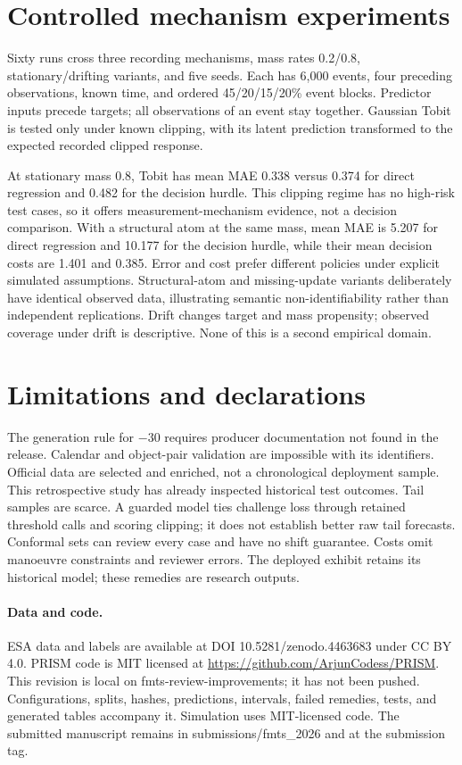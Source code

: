 \documentclass[10pt]{article}
\begin{document}
\section{Controlled mechanism experiments}
Sixty runs cross three recording mechanisms, mass rates 0.2/0.8, stationary/drifting variants, and five seeds. Each has 6,000 events, four preceding observations, known time, and ordered 45/20/15/20\% event blocks. Predictor inputs precede targets; all observations of an event stay together. Gaussian Tobit is tested only under known clipping, with its latent prediction transformed to the expected recorded clipped response.

At stationary mass 0.8, Tobit has mean MAE 0.338 versus 0.374 for direct regression and 0.482 for the decision hurdle. This clipping regime has no high-risk test cases, so it offers measurement-mechanism evidence, not a decision comparison. With a structural atom at the same mass, mean MAE is 5.207 for direct regression and 10.177 for the decision hurdle, while their mean decision costs are 1.401 and 0.385. Error and cost prefer different policies under explicit simulated assumptions. Structural-atom and missing-update variants deliberately have identical observed data, illustrating semantic non-identifiability rather than independent replications. Drift changes target and mass propensity; observed coverage under drift is descriptive. None of this is a second empirical domain.

\section{Limitations and declarations}
The generation rule for $-30$ requires producer documentation not found in the release. Calendar and object-pair validation are impossible with its identifiers. Official data are selected and enriched, not a chronological deployment sample. This retrospective study has already inspected historical test outcomes. Tail samples are scarce. A guarded model ties challenge loss through retained threshold calls and scoring clipping; it does not establish better raw tail forecasts. Conformal sets can review every case and have no shift guarantee. Costs omit manoeuvre constraints and reviewer errors. The deployed exhibit retains its historical model; these remedies are research outputs.

\begin{sloppypar}\paragraph{Data and code.} ESA data and labels are available at DOI 10.5281/zenodo.4463683 under CC BY 4.0. PRISM code is MIT licensed at \url{https://github.com/ArjunCodess/PRISM}. This revision is local on fmts-review-improvements; it has not been pushed. Configurations, splits, hashes, predictions, intervals, failed remedies, tests, and generated tables accompany it. Simulation uses MIT-licensed code. The submitted manuscript remains in submissions/fmts\_2026 and at the submission tag.\end{sloppypar}
\end{document}
